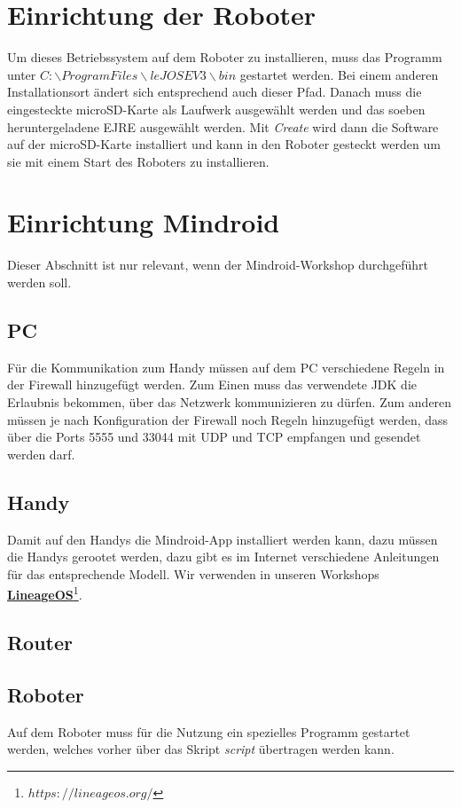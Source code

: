 \documentclass[
	ngerman,
	accentcolor=1c,%
	]{tudapub}
\begin{document}
\section{Einrichtung der Roboter}
Um dieses Betriebssystem auf dem Roboter zu installieren, muss das Programm unter \textit{$C:\backslash Program Files\backslash leJOS EV3\backslash bin$} gestartet werden. Bei einem anderen Installationsort \"andert sich entsprechend auch dieser Pfad.\newline
Danach muss die eingesteckte microSD-Karte als Laufwerk ausgew\"ahlt werden und das soeben heruntergeladene EJRE ausgew\"ahlt werden. Mit \textit{Create} wird dann die Software auf der microSD-Karte installiert und kann in den Roboter gesteckt werden um sie mit einem Start des Roboters zu installieren.

\section{Einrichtung Mindroid}
\label{Einrichtung-Mindroid}
Dieser Abschnitt ist nur relevant, wenn der Mindroid-Workshop durchgef\"uhrt werden soll.

\subsection{PC}
F\"ur die Kommunikation zum Handy m\"ussen auf dem PC verschiedene Regeln in der Firewall hinzugef\"ugt werden. Zum Einen muss das verwendete JDK die Erlaubnis bekommen, über das Netzwerk kommunizieren zu dürfen. Zum anderen müssen je nach Konfiguration der Firewall noch Regeln hinzugefügt werden, dass über die Ports 5555 und 33044 mit UDP und TCP empfangen und gesendet werden darf.

\subsection{Handy}
Damit auf den Handys die Mindroid-App installiert werden kann, dazu m\"ussen die Handys gerootet werden, dazu gibt es im Internet verschiedene Anleitungen für das entsprechende Modell. Wir verwenden in unseren Workshops \href{https://lineageos.org/}{\textbf{LineageOS}\footnote{$https://lineageos.org/$}}.
\subsection{Router}

\subsection{Roboter}
Auf dem Roboter muss f\"ur die Nutzung ein spezielles Programm gestartet werden, welches vorher \"uber das Skript \textit{script} \"ubertragen werden kann.
\end{document}
